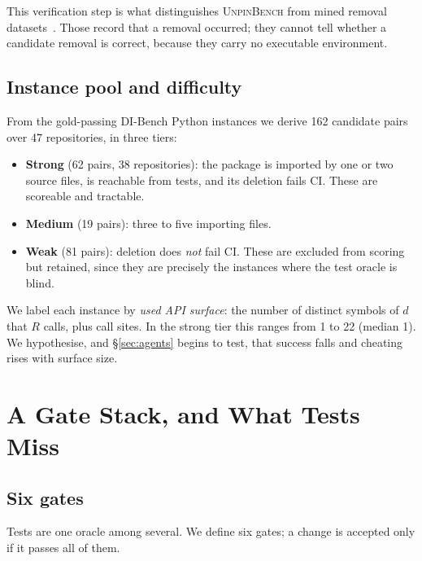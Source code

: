 \documentclass[10pt,conference]{IEEEtran}
\newif\ifdraft
\newcommand{\todo}[1]{\ifdraft\textcolor{red}{\textbf{[TODO: #1]}}\fi}
\newcommand{\bench}{\textsc{UnpinBench}}
\newcommand{\dibench}{DI-Bench}
\begin{document}
This verification step is what distinguishes \bench{} from mined removal
datasets~\cite{jaisri2024dataset,he2021migration}. Those record that a
removal occurred; they cannot tell whether a candidate removal is
correct, because they carry no executable environment.

\subsection{Instance pool and difficulty}

From the gold-passing \dibench{} Python instances we derive 162 candidate
pairs over 47 repositories, in three tiers:

\begin{itemize}
  \item \textbf{Strong} (62 pairs, 38 repositories): the package is
  imported by one or two source files, is reachable from tests, and its
  deletion fails CI. These are scoreable and tractable.
  \item \textbf{Medium} (19 pairs): three to five importing files.
  \item \textbf{Weak} (81 pairs): deletion does \emph{not} fail CI. These
  are excluded from scoring but retained, since they are precisely the
  instances where the test oracle is blind.
\end{itemize}

We label each instance by \emph{used API surface}: the number of distinct
symbols of $d$ that $R$ calls, plus call sites. In the strong tier this
ranges from 1 to 22 (median 1). We hypothesise, and \S\ref{sec:agents}
begins to test, that success falls and cheating rises with surface size.

\todo{full run: extend the pool by mining removal commits (repositories
cloned with full history) to obtain human reference solutions, and extend
to \dibench{}'s \emph{large} subset (50 further Python repositories).}

\section{A Gate Stack, and What Tests Miss}
\label{sec:gates}

\subsection{Six gates}

Tests are one oracle among several. We define six gates; a change is
accepted only if it passes all of them.
\end{document}
